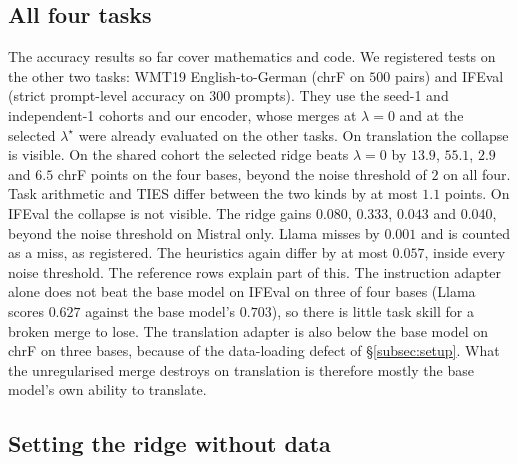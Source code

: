 \subsection{All four tasks}\label{app:alltasks}

The accuracy results so far cover mathematics and
code. We registered tests on the other two tasks: WMT19 English-to-German
(chrF on $500$ pairs) and IFEval (strict prompt-level accuracy on $300$
prompts). They use the seed-1 and independent-1 cohorts and our encoder, whose
merges at $\lambda = 0$ and at the selected $\lambda^\star$ were already
evaluated on the other tasks. On translation the collapse is visible. On the
shared cohort the selected ridge beats $\lambda = 0$ by $13.9$, $55.1$, $2.9$
and $6.5$ chrF points on the four bases, beyond the noise threshold of $2$ on all four. Task arithmetic and TIES
differ between the two kinds by at most $1.1$ points. On IFEval
the collapse is not visible. The ridge gains $0.080$, $0.333$, $0.043$ and
$0.040$, beyond the noise threshold on Mistral only. Llama misses by $0.001$ and is counted
as a miss, as registered. The heuristics again differ by at most $0.057$,
inside every noise threshold. The reference rows explain part of this. The instruction
adapter alone does not beat the base model on IFEval on three of four bases
(Llama scores $0.627$ against the base model's $0.703$), so there is little
task skill for a broken merge to lose. The translation adapter is also below
the base model on chrF on three bases, because of the data-loading defect of
\S\ref{subsec:setup}. What the unregularised merge destroys on translation is
therefore mostly the base model's own ability to translate.

\subsection{Setting the ridge without data}\label{subsec:lambda}

